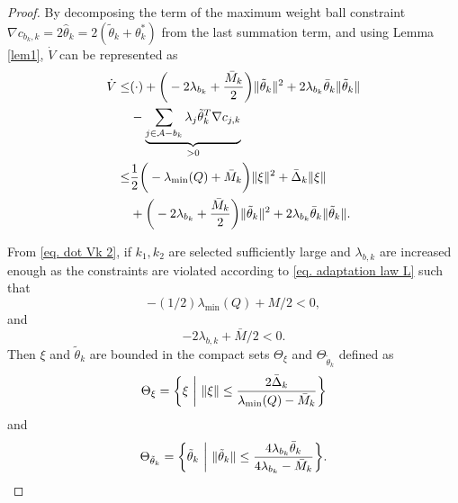 \documentclass[lettersize,journal]{IEEEtran}
\begin{document}
\begin{proof}
By decomposing the term of the maximum weight ball constraint $\nabla c_{b_k,k}=2\hat\theta_k=2(\tilde\theta_k+\theta^*_k)$ from the last summation term, and using Lemma \ref{lem1}, $\dot V$ can be represented as
\begin{equation*}
    \begin{aligned}
        \dot V \le&
        (\cdot) + 
        \bigg(
            -2\lambda _{b_k}+{\bar M_k\over 2}
        \bigg)
        \Vert\tilde\theta_k\Vert^2 
        +2\lambda_{b_k}\bar\theta_k\Vert\tilde\theta_k\Vert
        \\&
        - \underbrace{
        \sum_{j\in\mathcal{A}-b_k}\lambda_j\tilde\theta_k^T\nabla c_{j, k}
        }_{>0}	
        \\
        \le&
        {1\over 2}
        \bigg(
            -\lambda_\text{min}(Q)+\bar M_k
        \bigg)
        \Vert\xi\Vert^2
        +\bar \Delta_k \Vert \xi\Vert 
        \\&
        + 
        \bigg(
            -2\lambda _{b_k}+{\bar M_k\over 2}
        \bigg)
        \Vert\tilde\theta_k\Vert^2 +2\lambda_{b_k}\bar\theta_k\Vert\tilde\theta_k\Vert.
    \end{aligned}
    \label{eq. dot Vk 2}
\end{equation*}

From \eqref{eq. dot Vk 2}, if $k_1,k_2$ are selected sufficiently large and $\lambda_{b,k}$ are increased enough as the constraints are violated according to \eqref{eq. adaptation law L} such that
\begin{equation}
    -(1/2)\lambda_\text{min}(Q)+M/2<0,
    \label{eq. ctrl stable condition}
\end{equation}
and
\begin{equation*}
    -2\lambda_{b,k} +{\bar M/ 2}<0.    
\end{equation*}
Then $\xi$ and $\tilde\theta_k$ are bounded in the compact sets $\Theta_\xi$ and $\Theta_{\tilde\theta_k}$ defined as
\begin{equation*}
    \Theta_\xi = 
    \bigg\{ \xi \ \bigg\vert\ \Vert\xi\Vert \le  
    {2\bar \Delta _k\over \lambda _\text{min}(Q)-\bar M_k} 
    \bigg\}
\end{equation*}
and
\begin{equation*}
    \Theta_{\tilde\theta_k} = 
    \bigg\{ 
    \tilde\theta_k 
    \ 
    \bigg\vert
    \ 
    \Vert\tilde\theta_k\Vert \le  
    {
    4\lambda_{b_k}\bar \theta_k
    \over
    4\lambda_{b_k} - \bar M_k
    }
    \bigg\}
    .
\end{equation*}
 

\end{proof}
\end{document}
